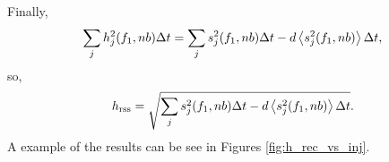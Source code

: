 \documentclass{article}
\begin{document}
Finally,
\begin{equation}
\sum_{j} h_{j}^{2}(f_{1}, n b) \Delta t
   = \sum_{j} s_{j}^{2}(f_{1}, n b) \Delta t - d \left\langle s_{j}^{2}(f_{1}, n
   b)\right\rangle \Delta t,
\end{equation}
so,
\begin{equation}
h_{\text{rss}}
   = \sqrt{\sum_{j} s_{j}^{2}(f_{1}, n b) \Delta t - d
   \left\langle s_{j}^{2}(f_{1}, n b)\right\rangle \Delta t}.
\end{equation}
A example of the results can be see in Figures \ref{fig:h_rec_vs_inj}.
\begin{figure}
\begin{center}

\end{center}
\end{figure}
\end{document}
